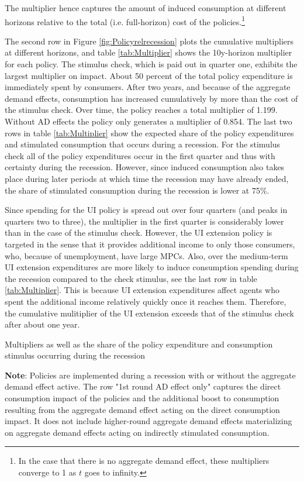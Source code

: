\documentclass[\econtexRoot/HAFiscal]{subfiles}
\begin{document}
The multiplier hence captures the amount of induced consumption at different horizons relative to the total (i.e.
full-horizon) cost of the policies.\footnote{In the case that there is no aggregate demand effect, these multipliers converge to 1 as $t$ goes to infinity.}


The second row in Figure \ref{fig:Policyrelrecession} plots the cumulative multipliers at different horizons, and table \ref{tab:Multiplier} shows the 10y-horizon multiplier for each policy.
The stimulus check, which is paid out in quarter one, exhibits the largest multiplier on impact.
About 50 percent of the total policy expenditure is immediately spent by consumers.
After two years, and because of the aggregate demand effects, consumption has increased cumulatively by more than the cost of the stimulus check.
Over time, the policy reaches a total multiplier of 1.199.
Without AD effects the policy only generates a multiplier of 0.854.
The last two rows in table \ref{tab:Multiplier} show the expected share of the policy expenditures and stimulated consumption that occurs during a recession.
For the stimulus check all of the policy expenditures occur in the first quarter and thus with certainty during the recession.
However, since induced consumption also takes place during later periods at which time the recession may have already ended, the share of stimulated consumption during the recession is lower at 75\%.

Since spending for the UI policy is spread out over four quarters (and peaks in quarters two to three), the multiplier in the first quarter is considerably lower than in the case of the stimulus check.
However, the UI extension policy is targeted in the sense that it provides additional income to only those consumers, who, because of unemployment, have large MPCs.
Also, over the medium-term UI extension expenditures are more likely to induce consumption spending during the recession compared to the check stimulus, see the last row in table \ref{tab:Multiplier}.
This is because UI extension expenditures affect agents who spent the additional income relatively quickly once it reaches them.
Therefore, the cumulative mulitiplier of the UI extension exceeds that of the stimulus check after about one year.


\begin{table}[t]
  \center
  
  \caption{Multipliers as well as the share of the policy expenditure and consumption stimulus occurring during the recession}
  \parbox{16cm}{\small \vspace{.15cm} \textbf{Note}: Policies are implemented during a recession with or without the aggregate demand effect active. The row "1st round AD effect only" captures the direct consumption impact of the policies and the additional boost to consumption resulting from the aggregate demand effect acting on the direct consumption impact. It does not include higher-round aggregate demand effects materializing on aggregate demand effects acting on indirectly stimulated consumption.\normalsize}
  \notinsubfile{\label{tab:Multiplier}}
\end{table}
\end{document}
